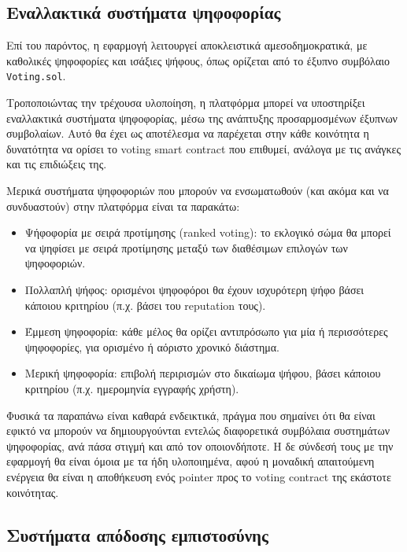 \subsection{Εναλλακτικά συστήματα ψηφοφορίας}\label{subsection:5-2-3-alternative-voting-systems}

Επί του παρόντος, η εφαρμογή λειτουργεί αποκλειστικά αμεσοδημοκρατικά, με καθολικές ψηφοφορίες και ισάξιες ψήφους, όπως ορίζεται από το έξυπνο συμβόλαιο \texttt{Voting.sol}.

Τροποποιώντας την τρέχουσα υλοποίηση, η πλατφόρμα μπορεί να υποστηρίξει εναλλακτικά συστήματα ψηφοφορίας, μέσω της ανάπτυξης προσαρμοσμένων έξυπνων συμβολαίων. Αυτό θα έχει ως αποτέλεσμα να παρέχεται στην κάθε κοινότητα η δυνατότητα να ορίσει το voting smart contract που επιθυμεί, ανάλογα με τις ανάγκες και τις επιδιώξεις της.

Μερικά συστήματα ψηφοφοριών που μπορούν να ενσωματωθούν (και ακόμα και να συνδυαστούν) στην πλατφόρμα είναι τα παρακάτω:

\begin{itemize}
	\item Ψήφοφορία με σειρά προτίμησης (ranked voting): το εκλογικό σώμα θα μπορεί να ψηφίσει με σειρά προτίμησης μεταξύ των διαθέσιμων επιλογών των ψηφοφοριών.
	\item Πολλαπλή ψήφος: ορισμένοι ψηφοφόροι θα έχουν ισχυρότερη ψήφο βάσει κάποιου κριτηρίου (π.χ. βάσει του reputation τους).
	\item Έμμεση ψηφοφορία: κάθε μέλος θα ορίζει αντιπρόσωπο για μία ή περισσότερες ψηφοφορίες, για ορισμένο ή αόριστο χρονικό διάστημα.
	\item Μερική ψηφοφορία: επιβολή περιρισμών στο δικαίωμα ψήφου, βάσει κάποιου κριτηρίου (π.χ. ημερομηνία εγγραφής χρήστη).
\end{itemize}

Φυσικά τα παραπάνω είναι καθαρά ενδεικτικά, πράγμα που σημαίνει ότι θα είναι εφικτό να μπορούν να δημιουργούνται εντελώς διαφορετικά συμβόλαια συστημάτων ψηφοφορίας, ανά πάσα στιγμή και από τον οποιονδήποτε. Η δε σύνδεσή τους με την εφαρμογή θα είναι όμοια με τα ήδη υλοποιημένα, αφού η μοναδική απαιτούμενη ενέργεια θα είναι η αποθήκευση ενός pointer προς το voting contract της εκάστοτε κοινότητας.

\subsection{Συστήματα απόδοσης εμπιστοσύνης}\label{subsection:5-2-4-reputation-systems}


